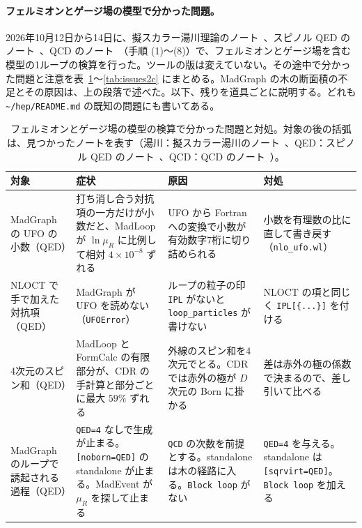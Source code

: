 \documentclass[a4paper,10pt]{ltjsarticle}
\newcommand{\pth}[1]{\texttt{\textasciitilde/}\nolinkurl{#1}}
\begin{document}
\paragraph{フェルミオンとゲージ場の模型で分かった問題。}2026年10月12日から14日に、擬スカラー湯川理論のノート~\cite{yukawanote}、スピノル QED のノート~\cite{qednote}、QCD のノート~\cite{qcdnote}（手順 (1)〜(8)）で、フェルミオンとゲージ場を含む模型の1ループの検算を行った。ツールの版は変えていない。その途中で分かった問題と注意を表~\ref{tab:issues2}〜\ref{tab:issues2c} にまとめる。MadGraph の木の断面積の不足とその原因は、上の段落で述べた。以下、残りを道具ごとに説明する。どれも \pth{hep/README.md} の既知の問題にも書いてある。

\begin{table}[p]
\centering\footnotesize
\caption{フェルミオンとゲージ場の模型の検算で分かった問題と対処。対象の後の括弧は、見つかったノートを表す（湯川：擬スカラー湯川のノート~\cite{yukawanote}、QED：スピノル QED のノート~\cite{qednote}、QCD：QCD のノート~\cite{qcdnote}）。}
\label{tab:issues2}
\begin{tabularx}{\linewidth}{>{\raggedright\arraybackslash}p{2.4cm}>{\raggedright\arraybackslash}X>{\raggedright\arraybackslash}X>{\raggedright\arraybackslash}X}
\toprule
\textbf{対象} & \textbf{症状} & \textbf{原因} & \textbf{対処} \\
\midrule
MadGraph の UFO の小数（QED） & 打ち消し合う対抗項の一方だけが小数だと、MadLoop が $\ln\mu_R$ に比例して相対 $4\times10^{-8}$ ずれる & UFO から Fortran への変換で小数が有効数字7桁に切り詰められる & 小数を有理数の比に直して書き戻す（\texttt{nlo\_ufo.wl}） \\
NLOCT で手で加えた対抗項（QED） & MadGraph が UFO を読めない（\texttt{UFOError}） & ループの粒子の印 \texttt{IPL} がないと \texttt{loop\_particles} が書けない & NLOCT の項と同じく \texttt{IPL[\{...\}]} を付ける \\
4次元のスピン和（QED） & MadLoop と FormCalc の有限部分が、CDR の手計算と部分ごとに最大 $59\%$ ずれる & 外線のスピン和を4次元でとる。CDR では赤外の極が $D$ 次元の Born に掛かる & 差は赤外の極の係数で決まるので、差し引いて比べる \\
MadGraph のループで誘起される過程（QED） & \texttt{QED=4} なしで生成が止まる。\texttt{[noborn=QED]} の standalone が止まる。MadEvent が $\mu_R$ を探して止まる & \texttt{QCD} の次数を前提とする。standalone は木の経路に入る。\texttt{Block loop} がない & \texttt{QED=4} を与える。standalone は \texttt{[sqrvirt=QED]}。\texttt{Block loop} を加える \\

\end{tabularx}
\end{table}
\end{document}
